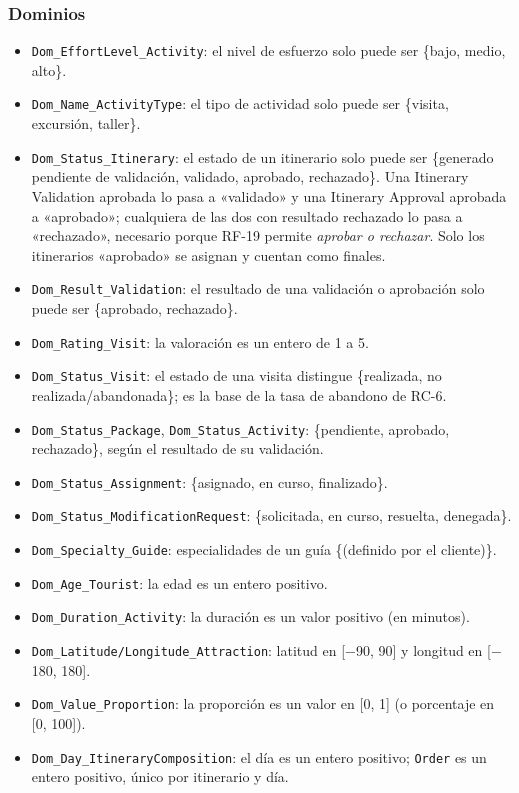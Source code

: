 \documentclass[11pt,a4paper]{article}
\begin{document}
\subsubsection*{Dominios}
\begin{itemize}[leftmargin=1.2em,itemsep=2pt,topsep=3pt]
\item \texttt{Dom\_\allowbreak{}EffortLevel\_\allowbreak{}Activity}: el nivel de esfuerzo solo puede ser \{bajo, medio, alto\}.
\item \texttt{Dom\_\allowbreak{}Name\_\allowbreak{}ActivityType}: el tipo de actividad solo puede ser \{visita, excursión, taller\}.
\item \texttt{Dom\_\allowbreak{}Status\_\allowbreak{}Itinerary}: el estado de un itinerario solo puede ser \{generado pendiente de validación, validado, aprobado, rechazado\}. Una Itinerary Validation aprobada lo pasa a «validado» y una Itinerary Approval aprobada a «aprobado»; cualquiera de las dos con resultado rechazado lo pasa a «rechazado», necesario porque RF-19 permite \textit{aprobar o rechazar}. Solo los itinerarios «aprobado» se asignan y cuentan como finales.
\item \texttt{Dom\_\allowbreak{}Result\_\allowbreak{}Validation}: el resultado de una validación o aprobación solo puede ser \{aprobado, rechazado\}.
\item \texttt{Dom\_\allowbreak{}Rating\_\allowbreak{}Visit}: la valoración es un entero de 1 a 5.
\item \texttt{Dom\_\allowbreak{}Status\_\allowbreak{}Visit}: el estado de una visita distingue \{realizada, no realizada/abandonada\}; es la base de la tasa de abandono de RC-6.
\item \texttt{Dom\_\allowbreak{}Status\_\allowbreak{}Package}, \texttt{Dom\_\allowbreak{}Status\_\allowbreak{}Activity}: \{pendiente, aprobado, rechazado\}, según el resultado de su validación.
\item \texttt{Dom\_\allowbreak{}Status\_\allowbreak{}Assignment}: \{asignado, en curso, finalizado\}.
\item \texttt{Dom\_\allowbreak{}Status\_\allowbreak{}ModificationRequest}: \{solicitada, en curso, resuelta, denegada\}.
\item \texttt{Dom\_\allowbreak{}Specialty\_\allowbreak{}Guide}: especialidades de un guía \{(definido por el cliente)\}.
\item \texttt{Dom\_\allowbreak{}Age\_\allowbreak{}Tourist}: la edad es un entero positivo.
\item \texttt{Dom\_\allowbreak{}Duration\_\allowbreak{}Activity}: la duración es un valor positivo (en minutos).
\item \texttt{Dom\_\allowbreak{}Latitude/Longitude\_\allowbreak{}Attraction}: latitud en [\ensuremath{-}90, 90] y longitud en [\ensuremath{-}180, 180].
\item \texttt{Dom\_\allowbreak{}Value\_\allowbreak{}Proportion}: la proporción es un valor en [0, 1] (o porcentaje en [0, 100]).
\item \texttt{Dom\_\allowbreak{}Day\_\allowbreak{}ItineraryComposition}: el día es un entero positivo; \texttt{Order} es un entero positivo, único por itinerario y día.
\end{itemize}
\end{document}
